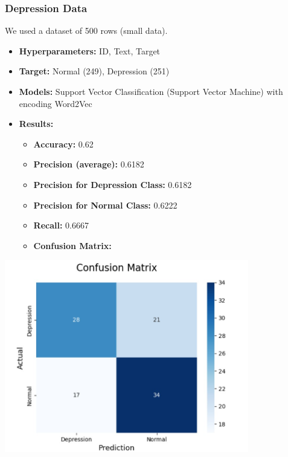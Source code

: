 \documentclass[a4paper,12pt]{article}
\begin{document}
\subsubsection{Depression Data}
We used a dataset of 500 rows (small data).
\begin{itemize}
    \item \textbf{Hyperparameters:} ID, Text, Target
    \item \textbf{Target:} Normal (249), Depression (251)
    \item \textbf{Models:} Support Vector Classification (Support Vector Machine) with encoding Word2Vec
    \item \textbf{Results:}
    \begin{itemize}
        \item \textbf{Accuracy:} 0.62
        \item \textbf{Precision (average):} 0.6182
        \item \textbf{Precision for Depression Class:} 0.6182
        \item \textbf{Precision for Normal Class:} 0.6222
        \item \textbf{Recall:} 0.6667
        \item \textbf{Confusion Matrix:}
    \end{itemize}
\end{itemize}

\begin{center}
    \includegraphics[width=0.8\textwidth]{Depression-Data-SmallData.jpg} %
\end{center}

\vspace{1cm} %
\end{document}
